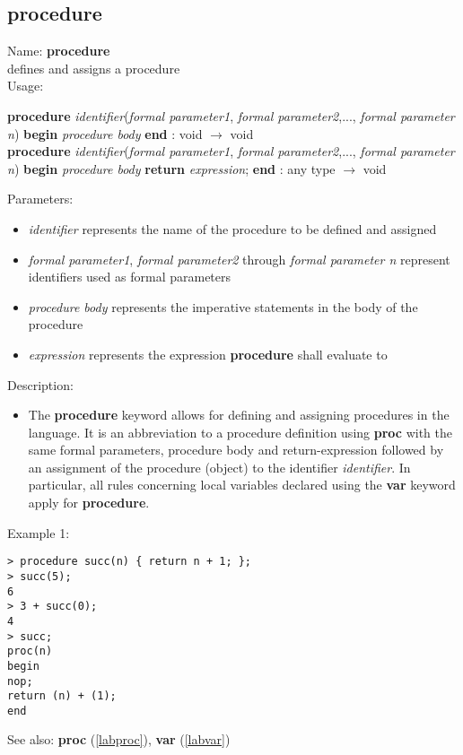 \subsection{procedure}
\label{labprocedure}
\noindent Name: \textbf{procedure}\\
defines and assigns a \sollya procedure\\

\noindent Usage: 
\begin{center}
\textbf{procedure} \emph{identifier}(\emph{formal parameter1}, \emph{formal parameter2},..., \emph{formal parameter n}) \textbf{begin} \emph{procedure body} \textbf{end} : \textsf{void} $\rightarrow$ \textsf{void}\\
\textbf{procedure} \emph{identifier}(\emph{formal parameter1}, \emph{formal parameter2},..., \emph{formal parameter n}) \textbf{begin} \emph{procedure body} \textbf{return} \emph{expression}; \textbf{end} : \textsf{any type} $\rightarrow$ \textsf{void}\\
\end{center}
Parameters: 
\begin{itemize}
\item \emph{identifier} represents the name of the procedure to be defined and assigned
\item \emph{formal parameter1}, \emph{formal parameter2} through \emph{formal parameter n} represent identifiers used as formal parameters
\item \emph{procedure body} represents the imperative statements in the body of the procedure
\item \emph{expression} represents the expression \textbf{procedure} shall evaluate to
\end{itemize}
\noindent Description: \begin{itemize}

\item The \textbf{procedure} keyword allows for defining and assigning procedures in
   the \sollya language. It is an abbreviation to a procedure definition
   using \textbf{proc} with the same formal parameters, procedure body and
   return-expression followed by an assignment of the procedure (object)
   to the identifier \emph{identifier}. In particular, all rules concerning
   local variables declared using the \textbf{var} keyword apply for \textbf{procedure}.
\end{itemize}
\noindent Example 1: 
\begin{center}\begin{minipage}{15cm}\begin{Verbatim}[frame=single]
> procedure succ(n) { return n + 1; };
> succ(5);
6
> 3 + succ(0);
4
> succ;
proc(n)
begin
nop;
return (n) + (1);
end
\end{Verbatim}
\end{minipage}\end{center}
See also: \textbf{proc} (\ref{labproc}), \textbf{var} (\ref{labvar})
